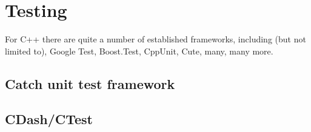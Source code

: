 \chapter{Testing}
\label{chap:testing}

For C++ there are quite a number of established frameworks, including (but not
limited to), Google Test, Boost.Test, CppUnit, Cute, many, many more.

\section{Catch unit test framework}


\section{CDash/CTest}


